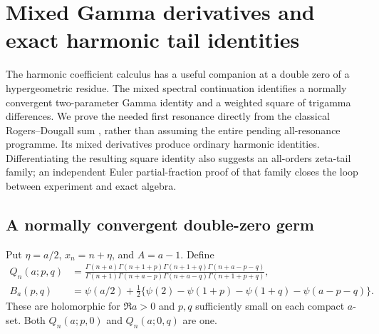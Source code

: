 \section{Mixed Gamma derivatives and exact harmonic tail identities}
\label{mx:section}
The harmonic coefficient calculus has a useful companion at a double
zero of a hypergeometric residue. The mixed spectral continuation
\cite{mx:report} identifies a normally convergent two-parameter Gamma
identity and a weighted square of trigamma differences. We prove the
needed first resonance directly from the classical Rogers--Dougall sum
\cite{mx:DLMFDougall}, rather than assuming the entire pending
all-resonance programme. Its mixed derivatives produce ordinary harmonic
identities. Differentiating the resulting square identity also suggests
an all-orders zeta-tail family; an independent Euler partial-fraction
proof of that family closes the loop between experiment and exact algebra.

\subsection{A normally convergent double-zero germ}
Put $\eta=a/2$, $x_n=n+\eta$, and $A=a-1$. Define
\begin{align}
 Q_n(a;p,q)&=
 \frac{\Gamma(n+a)\Gamma(n+1+p)\Gamma(n+1+q)\Gamma(n+a-p-q)}
 {\Gamma(n+1)\Gamma(n+a-p)\Gamma(n+a-q)\Gamma(n+1+p+q)},
 \label{mx:Q}\\
 B_a(p,q)&=\psi(a/2)+\tfrac12\{
 \psi(2)-\psi(1+p)-\psi(1+q)-\psi(a-p-q)\}.
 \label{mx:B}
\end{align}
These are holomorphic for $\Re a>0$ and $p,q$ sufficiently small
on each compact $a$-set. Both $Q_n(a;p,0)$ and $Q_n(a;0,q)$ are one.

